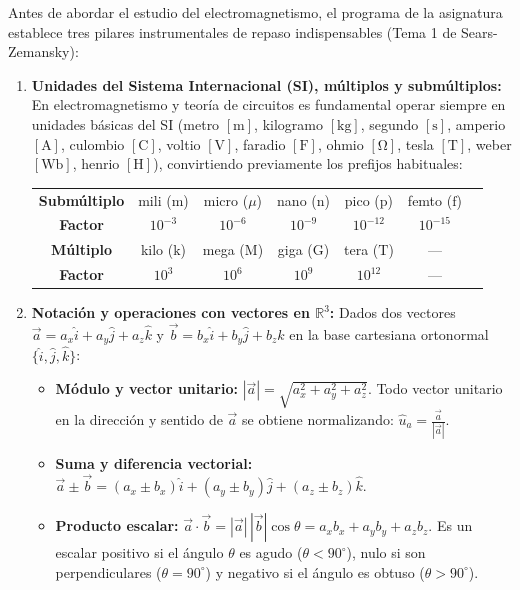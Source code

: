 Antes de abordar el estudio del electromagnetismo, el programa de la asignatura establece tres pilares instrumentales de repaso indispensables (Tema 1 de Sears-Zemansky):
\begin{enumerate}[leftmargin=*]
    \item \textbf{Unidades del Sistema Internacional (SI), múltiplos y submúltiplos:} En electromagnetismo y teoría de circuitos es fundamental operar siempre en unidades básicas del SI (metro $[\si{\meter}]$, kilogramo $[\si{\kilogram}]$, segundo $[\si{\second}]$, amperio $[\si{\ampere}]$, culombio $[\si{\coulomb}]$, voltio $[\si{\volt}]$, faradio $[\si{\farad}]$, ohmio $[\si{\ohm}]$, tesla $[\si{\tesla}]$, weber $[\si{\weber}]$, henrio $[\si{\henry}]$), convirtiendo previamente los prefijos habituales:
    \begin{center}
    \small
    \begin{tabular}{ccccccc}
        \toprule
        \textbf{Submúltiplo} & mili ($\text{m}$) & micro ($\mu$) & nano ($\text{n}$) & pico ($\text{p}$) & femto ($\text{f}$) \\
        \textbf{Factor} & $10^{-3}$ & $10^{-6}$ & $10^{-9}$ & $10^{-12}$ & $10^{-15}$ \\
        \midrule
        \textbf{Múltiplo} & kilo ($\text{k}$) & mega ($\text{M}$) & giga ($\text{G}$) & tera ($\text{T}$) & --- \\
        \textbf{Factor} & $10^{3}$ & $10^{6}$ & $10^{9}$ & $10^{12}$ & --- \\
        \bottomrule
    \end{tabular}
    \end{center}
    \item \textbf{Notación y operaciones con vectores en $\mathbb{R}^3$:} Dados dos vectores $\vec{a} = a_x\hat{i} + a_y\hat{j} + a_z\hat{k}$ y $\vec{b} = b_x\hat{i} + b_y\hat{j} + b_z\hat{k}$ en la base cartesiana ortonormal $\{\hat{i}, \hat{j}, \hat{k}\}$:
    \begin{itemize}[leftmargin=*]
        \item \textbf{Módulo y vector unitario:} $|\vec{a}| = \sqrt{a_x^2 + a_y^2 + a_z^2}$. Todo vector unitario en la dirección y sentido de $\vec{a}$ se obtiene normalizando: $\hat{u}_a = \frac{\vec{a}}{|\vec{a}|}$.
        \item \textbf{Suma y diferencia vectorial:} $\vec{a} \pm \vec{b} = (a_x \pm b_x)\hat{i} + (a_y \pm b_y)\hat{j} + (a_z \pm b_z)\hat{k}$.
        \item \textbf{Producto escalar:} $\vec{a} \cdot \vec{b} = |\vec{a}|\,|\vec{b}|\cos\theta = a_x b_x + a_y b_y + a_z b_z$. Es un escalar positivo si el ángulo $\theta$ es agudo ($\theta < 90^\circ$), nulo si son perpendiculares ($\theta = 90^\circ$) y negativo si el ángulo es obtuso ($\theta > 90^\circ$).

\end{itemize}
\end{enumerate}
